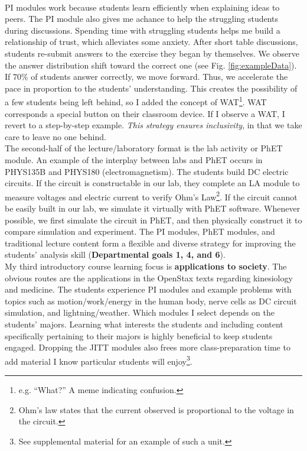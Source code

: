 \documentclass[../../../main.tex]{subfiles}
\begin{document}
\\
\vspace{0.25cm}
PI modules work because students learn efficiently when explaining ideas to peers.  The PI module also gives me achance to help the struggling students during discussions.  Spending time with struggling students helps me build a relationship of trust, which alleviates some anxiety.  After short table discussions, students re-submit answers to the exercise they began by themselves.  We observe the answer distribution shift toward the correct one (see Fig. \ref{fig:exampleData}).  If 70\% of students answer correctly, we move forward.  Thus, we accelerate the pace in proportion to the students' understanding.  This creates the possibility of a few students being left behind, so I added the concept of WAT\footnote{e.g. ``What?'' A meme indicating confusion.}.  WAT corresponds a special button on their classroom device.  If I observe a WAT, I revert to a step-by-step example.  \textit{This strategy ensures inclusivity}, in that we take care to leave no one behind.
\\
\vspace{0.25cm}
The second-half of the lecture/laboratory format is the lab activity or PhET module.  An example of the interplay between labs and PhET occurs in PHYS135B and PHYS180 (electromagnetism).  The students build DC electric circuits.  If the circuit is constructable in our lab, they complete an LA module to measure voltages and electric current to verify Ohm's Law\footnote{Ohm's law states that the current observed is proportional to the voltage in the circuit.}.  If the circuit cannot be easily built in our lab, we simulate it virtually with PhET software.  Whenever possible, we first simulate the circuit in PhET, and then physically construct it to compare simulation and experiment.  The PI modules, PhET modules, and traditional lecture content form a flexible and diverse strategy for improving the students' analysis skill (\textbf{Departmental goals 1, 4, and 6}).
\\
\vspace{0.25cm}
My third introductory course learning focus is \textbf{applications to society}.  The obvious routes are the applications in the OpenStax texts \cite{openstax1} regarding kinesiology and medicine.  The students experience PI modules and example problems with topics such as motion/work/energy in the human body, nerve cells as DC circuit simulation, and lightning/weather.  Which modules I select depends on the students' majors.  Learning what interests the students and including content specifically pertaining to their majors is highly beneficial to keep students engaged.  Dropping the JITT modules also frees more class-preparation time to add material I know particular students will enjoy\footnote{See supplemental material for an example of such a unit.}.
\end{document}
